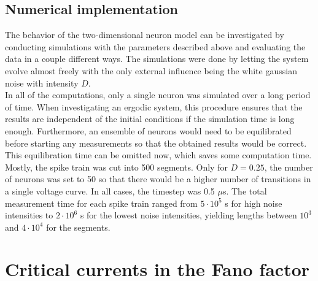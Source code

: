 \documentclass[12pt,a4paper]{article}
\begin{document}
\subsection{Numerical implementation}
The behavior of the two-dimensional neuron model can be investigated by conducting simulations with the parameters described above and evaluating the data in a couple different ways. The simulations were done by letting the system evolve almost freely with the only external influence being the white gaussian noise with intensity $D$. \\
In all of the computations, only a single neuron was simulated over a long period of time. When investigating an ergodic system, this procedure ensures that the results are independent of the initial conditions if the simulation time is long enough. Furthermore, an ensemble of neurons would need to be equilibrated before starting any measurements so that the obtained results would be correct. This equilibration time can be omitted now, which saves some computation time. \\
Mostly, the spike train was cut into 500 segments. Only for $D=0.25$, the number of neurons was set to 50 so that there would be a higher number of transitions in a single voltage curve. In all cases, the timestep was 0.5 $\mu$s. The total measurement time for each spike train ranged from $5\cdot10^5$ s for high noise intensities to $2\cdot 10^6$ s for the lowest noise intensities, yielding lengths between $10^3$ and $4\cdot10^4$ for the segments.


\section{Critical currents in the Fano factor}
\end{document}
